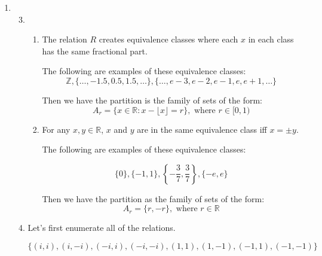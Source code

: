 \documentclass[12pt,letterpaper]{article}
\begin{document}
\begin{enumerate}
\begin{enumerate}
\begin{proof}
            Choose $x = 1, y = 2, z = 4$.
            Then $x, y, z, w \in \mathbb{N}$ and $1 + 2 = 3 = 3(1), 2 + 4 = 6 = 3(2)$,
            so $x S y$ and $y S z$.

            Now, if $S$ were transitive, we'd have $x S z$.
            However, $1 + 4 = 5$ and 3 does not divide 5.

            So $S$ is not transitive.

            Thus, $S$ is not an equivalence relation.
          \end{proof}
      \end{enumerate}
    \item
      \begin{enumerate}
        \setcounter{enumii}{2}
        \item
          \begin{enumerate}
            \item
              The relation $R$ creates equivalence classes where each $x$ in each class has the same fractional part.

              The following are examples of these equivalence classes:
              \[
                \mathbb{Z}, \{\dots, -1.5, 0.5, 1.5, \dots\}, \{\dots, e - 3, e - 2, e - 1, e, e + 1, \dots\}
              \]

              Then we have the partition is the family of sets of the form:
              \[
                A_r = \{x \in \mathbb{R} : x - \lfloor x \rfloor = r\}, \text{ where } r \in [0, 1)
              \]
            \setcounter{enumiii}{3}
            \item
              For any $x, y \in \mathbb{R}$, $x$ and $y$ are in the same equivalence class iff $x = \pm y$.

              The following are examples of these equivalence classes:

              \[
                \{0\}, \{-1, 1\}, \left\{-\frac{3}{7}, \frac{3}{7}\right\}, \{-e, e\}
              \]

              Then we have the partition as the family of sets of the form:
              \[
                A_r = \{r, -r\}, \text{ where } r \in \mathbb{R}
              \]
          \end{enumerate}
        \item
          Let's first enumerate all of the relations.

          \[
            \{(i, i), (i, -i), (-i, i), (-i, -i), (1, 1), (1, -1), (-1, 1), (-1, -1)\}
          \]


\end{enumerate}
\end{enumerate}
\end{document}
